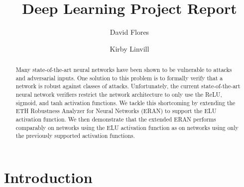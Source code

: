 \documentclass{llncs}
\begin{document}
\pagestyle{headings}
\mainmatter

\title{Deep Learning Project Report} %



\author{David Flores \and Kirby Linvill}


\maketitle

\begin{abstract}
    Many state-of-the-art neural networks have been shown to be vulnerable to attacks and adversarial inputs.
    One solution to this problem is to formally verify that a network is robust against classes of attacks.
    Unfortunately, the current state-of-the-art neural network verifiers restrict the network architecture to only use the ReLU, sigmoid, and tanh activation functions.
    We tackle this shortcoming by extending the ETH Robustness Analyzer for Neural Networks (ERAN) to support the ELU activation function.
    We then demonstrate that the extended ERAN performs comparably on networks using the ELU activation function as on networks using only the previously supported activation functions.

\end{abstract}

\section{Introduction}
\end{document}
